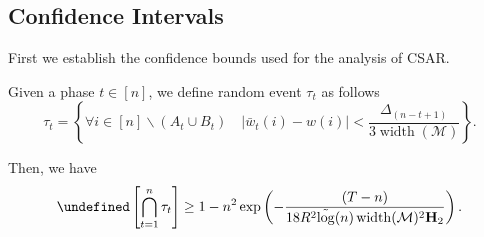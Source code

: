 \documentclass{article}
\newcommand{\junk}[1]{}
\newcommand{\AlgorithmBud}{{\small \textsf{CSAR}}\xspace}
\newcommand{\M}{\mathcal M}
\newcommand{\del}{\backslash}
\DeclareMathOperator{\rank}{width}
\newcommand{\barlog}{\tilde{\log}}
\let\Pr\undefined
\DeclareMathOperator{\Pr}{Pr}
\begin{document}
\junk{
\begin{lemma}
For each phase $t>0$ and each active arm $e\in [n] \del (A_t \cup B_t)$ of phase $t$, 
the arm $e$ must be pulled for at least $\tilde T_t$ times by Algorithm~X during phases $1,\ldots,t$, where $\tilde T$ is given by
\begin{equation}
\label{eq:define-tilde-t}
\tilde T_t = \left\lceil \frac{T-n}{\barlog(n)(n-t+1)} \right\rceil.
\end{equation}
\label{lemma:fbudget:samples}
\end{lemma}

\begin{proof}
Consider an arbitrary phase $t\in [n]$ and an arbitrary active arm $e\in [n] \del (A_t\cup B_t)$ of phase $t$.
Then, we can compute the number of pulls of arm $e$ as follows
\begin{equation}
\end{equation}
\end{proof}
}

\subsection{Confidence Intervals}


First we establish the confidence bounds used for the analysis of \AlgorithmBud. 
\begin{lemma}
\label{lemma:fbudget:ci}

Given a phase $t\in[n]$, we define random event $\tau_t$ as follows
\begin{equation}
\label{eq:define-tau}
\tau_t = \left\{\forall i\in[n] \del (A_t\cup B_t) \quad \big|\bar w_t(i)-w(i)\big| < \frac{\Delta_{(n-t+1)}}{3\rank(\M)} \right\}.
\end{equation}

Then, we have
\begin{equation}
\label{eq:fbudget-prob-error-1}
\Pr\left[\bigcap_{t=1}^n \tau_t \right] \ge 1- n^2  \exp\left(-\frac{(T-n)}{18 R^2 \barlog(n) \rank(\M)^2 \mathbf H_2} \right).
\end{equation}
\end{lemma}
\end{document}
